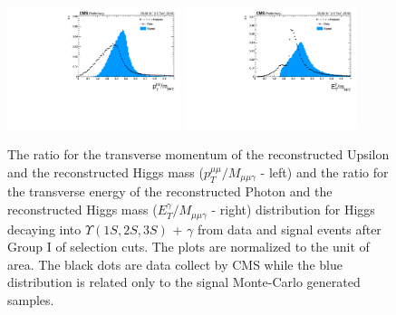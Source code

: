 \begin{figure}[!htbp]
\begin{center}
\includegraphics[width=0.45\textwidth]{figures_and_tables/outputPlots/HtoUpsilon_Cat0_ZZZZZ/au/data_x_mc/noKinCuts/h_noKin_upsilonPt_over_zMass}\hspace*{1.cm}
\includegraphics[width=0.45\textwidth]{figures_and_tables/outputPlots/HtoUpsilon_Cat0_ZZZZZ/au/data_x_mc/noKinCuts/h_noKin_photonPt_over_zMass}
\end{center}\vspace*{-.5cm}
\caption{The ratio for the transverse momentum of the reconstructed Upsilon and the reconstructed Higgs mass ($p_{T}^{\mu\mu}/M_{\mu\mu\gamma}$ - left) and the ratio for the transverse energy of the reconstructed Photon and the reconstructed Higgs mass ($E_{T}^{\gamma}/M_{\mu\mu\gamma}$ - right) distribution for Higgs decaying into $\Upsilon(1S,2S,3S)$ + $\gamma$ from data and signal events after Group I of selection cuts. The plots are normalized to the unit of area. The black dots are data collect by CMS while the blue distribution is related only to the signal Monte-Carlo generated samples.}
\label{fig:energy_ration_HtoUpsilon_Cat0}
\end{figure}

